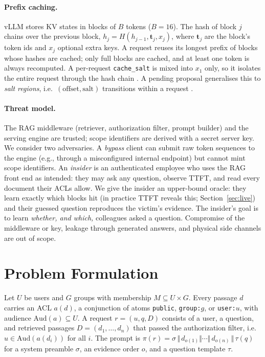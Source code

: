 \documentclass[11pt]{article}
\newcommand{\aud}{\mathrm{Aud}}
\begin{document}
\paragraph{Prefix caching.} vLLM stores KV states in blocks of $B$ tokens ($B{=}16$). The hash of block $j$ chains over the previous block, $h_j = H(h_{j-1}, \mathbf{t}_j, x_j)$, where $\mathbf{t}_j$ are the block's token ids and $x_j$ optional extra keys. A request reuses its longest prefix of blocks whose hashes are cached; only full blocks are cached, and at least one token is always recomputed. A per-request \texttt{cache\_salt} is mixed into $x_1$ only, so it isolates the entire request through the hash chain \citep{vllm2026security}. A pending proposal generalises this to \emph{salt regions}, i.e.\ $(\text{offset}, \text{salt})$ transitions within a request \citep{vllm2025rfc,vllm2026saltregions}.

\paragraph{Threat model.} The RAG middleware (retriever, authorization filter, prompt builder) and the serving engine are trusted; scope identifiers are derived with a secret server key. We consider two adversaries. A \emph{bypass} client can submit raw token sequences to the engine (e.g., through a misconfigured internal endpoint) but cannot mint scope identifiers. An \emph{insider} is an authenticated employee who uses the RAG front end as intended: they may ask any question, observe TTFT, and read every document their ACLs allow. We give the insider an upper-bound oracle: they learn exactly which blocks hit (in practice TTFT reveals this; Section~\ref{sec:live}) and their guessed question reproduces the victim's evidence. The insider's goal is to learn \emph{whether, and which,} colleagues asked a question. Compromise of the middleware or key, leakage through generated answers, and physical side channels are out of scope.

\section{Problem Formulation}
\label{sec:problem}

Let $U$ be users and $G$ groups with membership $M\subseteq U\times G$. Every passage $d$ carries an ACL $a(d)$, a conjunction of atoms \texttt{public}, \texttt{group:}$g$, or \texttt{user:}$u$, with audience $\aud(a)\subseteq U$. A request $r=(u, q, D)$ consists of a user, a question, and retrieved passages $D=(d_1,\dots,d_n)$ that passed the authorization filter, i.e.\ $u\in\aud(a(d_i))$ for all $i$. The prompt is $\pi(r) = \sigma \,\Vert\, d_{o(1)} \Vert \cdots \Vert\, d_{o(n)} \,\Vert\, \tau(q)$ for a system preamble $\sigma$, an evidence order $o$, and a question template $\tau$.
\end{document}
